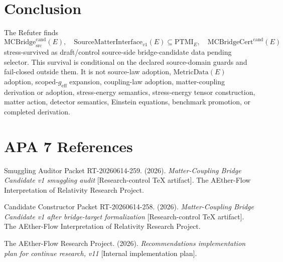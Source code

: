 \documentclass[11pt]{article}
\newcommand{\MetricData}{\mathrm{MetricData}}
\newcommand{\geff}{g_{\mathrm{eff}}}
\newcommand{\MCBridgeCand}{\mathrm{MCBridge}_{\mathrm{src}}^{\mathrm{cand}}}
\newcommand{\MCBridgeCertCand}{\mathrm{MCBridgeCert}^{\mathrm{cand}}}
\newcommand{\SMI}{\mathrm{SourceMatterInterface}_{v1}}
\newcommand{\PTMI}{\mathrm{PTMI}}
\begin{document}
\section{Conclusion}

The Refuter finds
\[
  \MCBridgeCand(E),\quad \SMI(E)\subseteq\PTMI_E,\quad
  \MCBridgeCertCand(E)
\]
stress-survived as draft/control source-side bridge-candidate data pending
selector. This survival is conditional on the declared source-domain guards
and fail-closed outside them. It is not source-law adoption,
\(\MetricData(E)\) adoption, scoped-\(\geff\) expansion, coupling-law
adoption, matter-coupling derivation or adoption, stress-energy semantics,
stress-energy tensor construction, matter action, detector semantics,
Einstein equations, benchmark promotion, or completed derivation.

\section{APA 7 References}

Smuggling Auditor Packet RT-20260614-259. (2026). \emph{Matter-Coupling
Bridge Candidate v1 smuggling audit} [Research-control TeX artifact]. The
AEther-Flow Interpretation of Relativity Research Project.

Candidate Constructor Packet RT-20260614-258. (2026). \emph{Matter-Coupling
Bridge Candidate v1 after bridge-target formalization} [Research-control
TeX artifact]. The AEther-Flow Interpretation of Relativity Research
Project.

The AEther-Flow Research Project. (2026). \emph{Recommendations
implementation plan for continue research, v11} [Internal implementation
plan].
\end{document}
